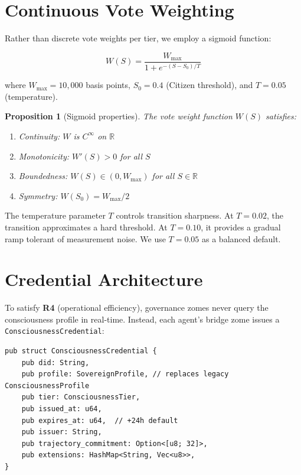 \documentclass[11pt,twocolumn]{article}
\newtheorem{proposition}{Proposition}
\begin{document}
\section{Continuous Vote Weighting}

Rather than discrete vote weights per tier, we employ a sigmoid function:

\begin{equation}
  W(S) = \frac{W_{\max}}{1 + e^{-(S - S_0) / T}}
\end{equation}

where $W_{\max} = 10{,}000$ basis points, $S_0 = 0.4$ (Citizen threshold),
and $T = 0.05$ (temperature).

\begin{proposition}[Sigmoid properties]
The vote weight function $W(S)$ satisfies:
\begin{enumerate}[nosep]
  \item Continuity: $W$ is $C^\infty$ on $\mathbb{R}$
  \item Monotonicity: $W'(S) > 0$ for all $S$
  \item Boundedness: $W(S) \in (0, W_{\max})$ for all $S \in \mathbb{R}$
  \item Symmetry: $W(S_0) = W_{\max}/2$
\end{enumerate}
\end{proposition}

The temperature parameter $T$ controls transition sharpness. At $T = 0.02$,
the transition approximates a hard threshold. At $T = 0.10$, it provides
a gradual ramp tolerant of measurement noise. We use $T = 0.05$ as a
balanced default.

\section{Credential Architecture}

To satisfy \textbf{R4} (operational efficiency), governance zomes never
query the consciousness profile in real-time. Instead, each agent's bridge
zome issues a \texttt{ConsciousnessCredential}:

\begin{lstlisting}
pub struct ConsciousnessCredential {
    pub did: String,
    pub profile: SovereignProfile, // replaces legacy ConsciousnessProfile
    pub tier: ConsciousnessTier,
    pub issued_at: u64,
    pub expires_at: u64,  // +24h default
    pub issuer: String,
    pub trajectory_commitment: Option<[u8; 32]>,
    pub extensions: HashMap<String, Vec<u8>>,
}
\end{lstlisting}
\end{document}
